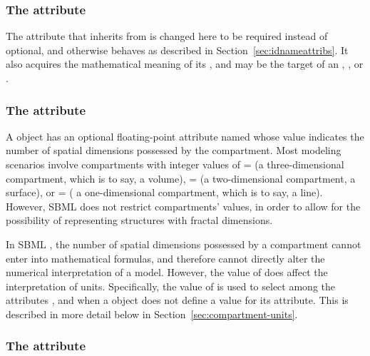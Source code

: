 \begin{blockChanged}
\subsubsection{The  attribute}

The  attribute that \Compartment inherits from \SBase is changed here to be required instead of optional, and otherwise behaves as described in Section~\ref{sec:idnameattribs}.  It also acquires the mathematical meaning of its , and may be the target of an \InitialAssignment, \EventAssignment, or \Rule.
\end{blockChanged}

\subsubsection{The  attribute}
\label{sec:compartment-spatialdimensions}

A \Compartment object has an optional floating-point attribute
named  whose value indicates the number
of spatial dimensions possessed by the compartment.  Most modeling
scenarios involve compartments with integer values of
= (\ie a three-dimensional
compartment, which is to say, a volume),
= (\ie a two-dimensional
compartment, a surface), or = (\ie
a one-dimensional compartment, which is to say, a line).  However,
SBML \thisL does not restrict compartments'
 values, in order to allow for the
possibility of representing structures with fractal dimensions.

In SBML \thisLV, the number of spatial dimensions possessed by a
compartment cannot enter into mathematical formulas, and therefore
cannot directly alter the numerical interpretation of a model.
However, the value of  does affect the
interpretation of units.  Specifically, the value of
 is used to select among the \Model
attributes ,  and
 when a \Compartment object does not define a
value for its  attribute.  This is described in more
detail below in Section~\ref{sec:compartment-units}.


\subsubsection{The  attribute}
\label{sec:compartment-size}
\label{sec:size}

